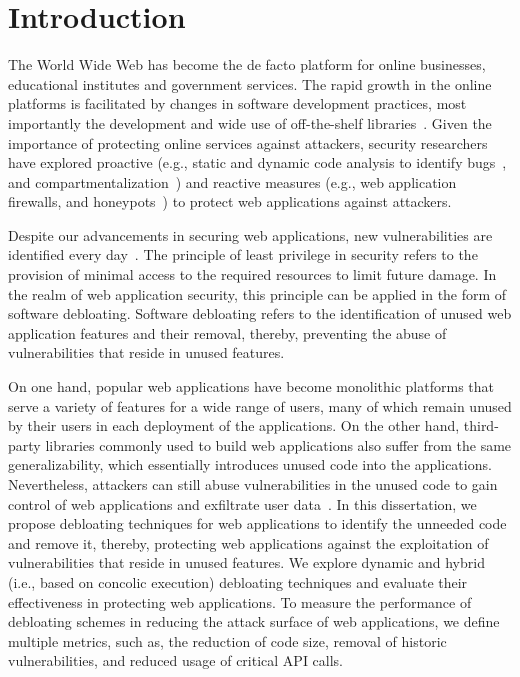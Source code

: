 \chapter{Introduction}

The World Wide Web has become the de facto platform for online businesses, educational institutes and government services. 
The rapid growth in the online platforms is facilitated by changes in software development practices, most importantly the development and wide use of off-the-shelf libraries~\cite{packagiststats, npmstatistics, pypi}. 
Given the importance of protecting online services against attackers, security researchers have explored proactive (e.g., static and dynamic code analysis to identify bugs~\cite{jovanovic2006pixy, dahse2010rips, alhuzali2018navex}, and 
compartmentalization~\cite{vasilakis2018breakapp}) and reactive measures (e.g., web application firewalls, and honeypots~\cite{makiou2014improving, barron2021click}) to protect web applications against attackers. 

Despite our advancements in securing web applications, new vulnerabilities are identified every day~\cite{cvedetails}. 
The principle of least privilege in security refers to the provision of minimal access to the required resources to limit future damage. 
In the realm of web application security, this principle can be applied in the form of software debloating. 
Software debloating refers to the identification of unused web application features and their removal, thereby, preventing the abuse of vulnerabilities that reside in unused features. 

On one hand, popular web applications have become monolithic platforms that serve a variety of features for a wide range of users, many of which remain unused by their users in each deployment of the applications. 
On the other hand, third-party libraries commonly used to build web applications also suffer from the same generalizability, which essentially introduces unused code into the applications. 
Nevertheless, attackers can still abuse vulnerabilities in the unused code to gain control of web applications and exfiltrate user data~\cite{drupalVulenrability, zendVulnerability, phpunitVulnerability, PHPGGC}. 
In this dissertation, we propose debloating techniques for web applications to identify the unneeded code and remove it, thereby, protecting web applications against the exploitation of vulnerabilities that reside in unused features. 
We explore dynamic and hybrid (i.e., based on concolic execution) debloating techniques and evaluate their effectiveness in protecting web applications. 
To measure the performance of debloating schemes in reducing the attack surface of web applications, we define multiple metrics, such as, the reduction of code size, removal of historic vulnerabilities, and reduced usage of critical API calls. 



